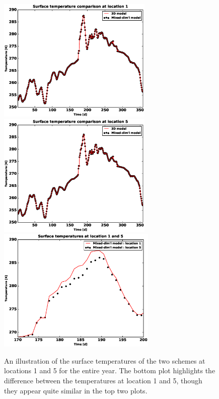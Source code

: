 \documentclass[review]{elsarticle}
\begin{document}
\begin{figure}[!htpb]
\centering
\includegraphics[height = 5.9cm, width=11.cm]{figures/comparison/regular/surf-temp/comp-temp-location1.eps} \\
\includegraphics[height = 5.9cm, width=11.cm]{figures/comparison/regular/surf-temp/comp-temp-location5.eps}
\includegraphics[height = 5.9cm, width=11.cm]{figures/comparison/regular/surf-temp/comp-temp-location1-5.eps}
\caption{An illustration of the surface temperatures of the two schemes at locations 1 and 5 for the entire year. The bottom plot highlights the difference between the temperatures at location 1 and 5, though they appear quite similar in the top two plots.}
\label{surf-temp-comp}
\end{figure}
\end{document}
